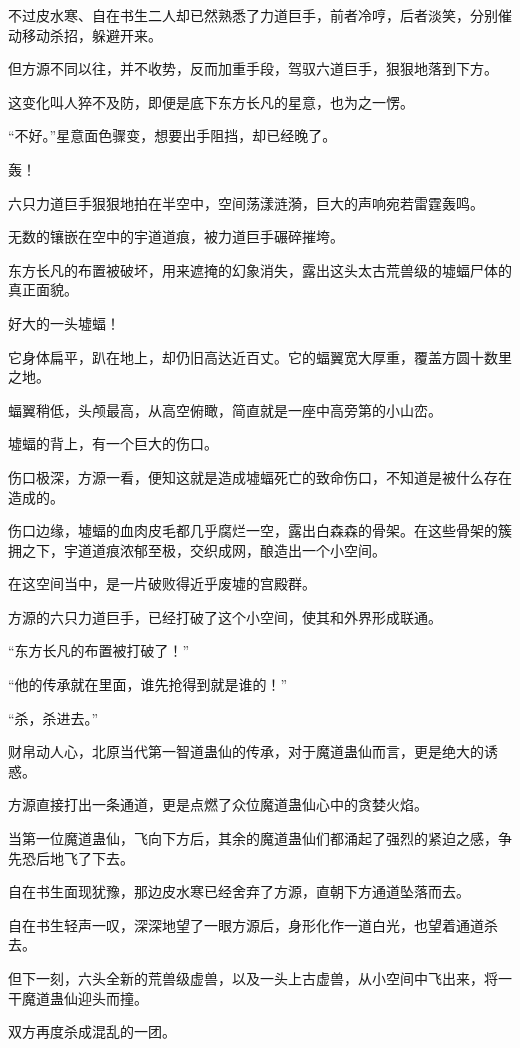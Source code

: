 \begin{this_body}
不过皮水寒、自在书生二人却已然熟悉了力道巨手，前者冷哼，后者淡笑，分别催动移动杀招，躲避开来。

但方源不同以往，并不收势，反而加重手段，驾驭六道巨手，狠狠地落到下方。

这变化叫人猝不及防，即便是底下东方长凡的星意，也为之一愣。

“不好。”星意面色骤变，想要出手阻挡，却已经晚了。

轰！

六只力道巨手狠狠地拍在半空中，空间荡漾涟漪，巨大的声响宛若雷霆轰鸣。

无数的镶嵌在空中的宇道道痕，被力道巨手碾碎摧垮。

东方长凡的布置被破坏，用来遮掩的幻象消失，露出这头太古荒兽级的墟蝠尸体的真正面貌。

好大的一头墟蝠！

它身体扁平，趴在地上，却仍旧高达近百丈。它的蝠翼宽大厚重，覆盖方圆十数里之地。

蝠翼稍低，头颅最高，从高空俯瞰，简直就是一座中高旁第的小山峦。

墟蝠的背上，有一个巨大的伤口。

伤口极深，方源一看，便知这就是造成墟蝠死亡的致命伤口，不知道是被什么存在造成的。

伤口边缘，墟蝠的血肉皮毛都几乎腐烂一空，露出白森森的骨架。在这些骨架的簇拥之下，宇道道痕浓郁至极，交织成网，酿造出一个小空间。

在这空间当中，是一片破败得近乎废墟的宫殿群。

方源的六只力道巨手，已经打破了这个小空间，使其和外界形成联通。

“东方长凡的布置被打破了！”

“他的传承就在里面，谁先抢得到就是谁的！”

“杀，杀进去。”

财帛动人心，北原当代第一智道蛊仙的传承，对于魔道蛊仙而言，更是绝大的诱惑。

方源直接打出一条通道，更是点燃了众位魔道蛊仙心中的贪婪火焰。

当第一位魔道蛊仙，飞向下方后，其余的魔道蛊仙们都涌起了强烈的紧迫之感，争先恐后地飞了下去。

自在书生面现犹豫，那边皮水寒已经舍弃了方源，直朝下方通道坠落而去。

自在书生轻声一叹，深深地望了一眼方源后，身形化作一道白光，也望着通道杀去。

但下一刻，六头全新的荒兽级虚兽，以及一头上古虚兽，从小空间中飞出来，将一干魔道蛊仙迎头而撞。

双方再度杀成混乱的一团。


\end{this_body}
